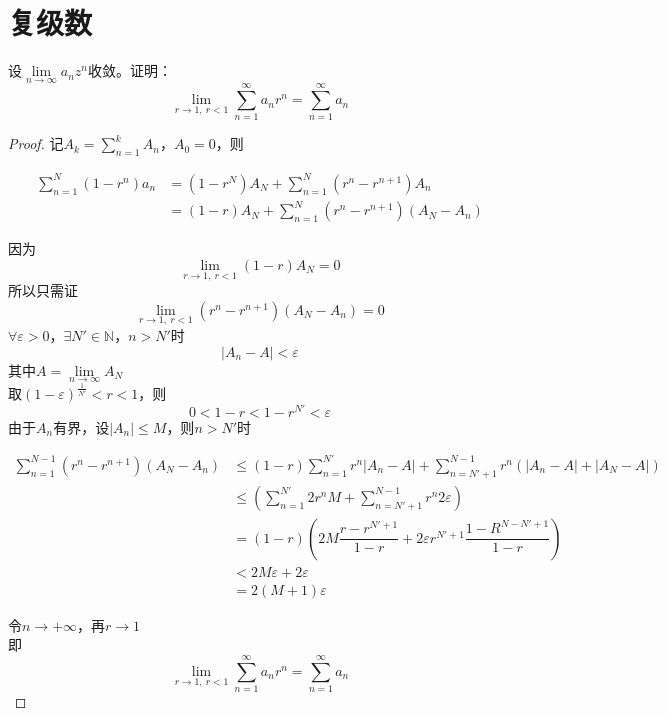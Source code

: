 \section{复级数}

\begin{proposition}

    设$\lim\limits_{n \to \infty}{a_nz^n}$收敛。证明：
    \[\lim\limits_{r \to 1, \ r < 1}{\sum\limits_{n = 1}^{\infty}{a_nr^n}} = \sum\limits_{n = 1}^{\infty}{a_n}\]

\end{proposition}

\begin{proof}
    
    记$A_k = \sum\limits_{n = 1}^{k}{A_n}$，$A_0 = 0$，则

    \begin{align*}
        \sum\limits_{n = 1}^{N}{(1 - r^n)a_n} & = (1 - r^N)A_N + \sum\limits_{n = 1}^{N}{(r^n - r^{n + 1})A_n} \\
        & = (1 - r)A_N + \sum\limits_{n = 1}^{N}{(r^n - r^{n + 1})(A_N - A_n)}
    \end{align*}

    因为
    \[\lim\limits_{r \to 1, \ r < 1}{(1 - r)A_N} = 0\]
    所以只需证
    \[\lim\limits_{r \to 1, \ r < 1}{(r^n - r^{n + 1})(A_N - A_n)} = 0\]
    $\forall \varepsilon > 0 $，$\exists N' \in \mathbb{N}$，$n > N'$时
    \[|A_n - A| < \varepsilon \]
    其中$A = \lim\limits_{n \to \infty}{A_N}$ \\
    取$(1 - \varepsilon)^{\frac{1}{N'}} < r < 1$，则
    \[0 < 1 - r < 1 - r^{N'} < \varepsilon \]
    由于$A_n$有界，设$|A_n| \leq M $，则$n > N'$时
    
    \begin{align*}
        \sum\limits_{n = 1}^{N - 1}{(r^n - r^{n + 1})(A_N - A_n)} & \leq (1 - r)\sum\limits_{n = 1}^{N'}{r^n|A_n - A|} + \sum\limits_{n = N' + 1}^{N - 1}{r^n(|A_n - A| + |A_N - A|)} \\
        & \leq (\sum\limits_{n = 1}^{N'}{2r^nM} + \sum\limits_{n = N' + 1}^{N - 1}{r^n2\varepsilon}) \\
        & = (1 - r)\left( 2M\dfrac{r - r^{N' + 1}}{1 - r} + 2\varepsilon r^{N' + 1}\dfrac{1 - R^{N - N' + 1}}{1 - r} \right) \\
        & < 2M\varepsilon + 2\varepsilon \\
        & = 2(M + 1)\varepsilon
    \end{align*}

    令$n \to +\infty$，再$r \to 1$ \\
    即
    \[\lim\limits_{r \to 1, \ r < 1}{\sum\limits_{n = 1}^{\infty}{a_nr^n}} = \sum\limits_{n = 1}^{\infty}{a_n}\]

\end{proof}

